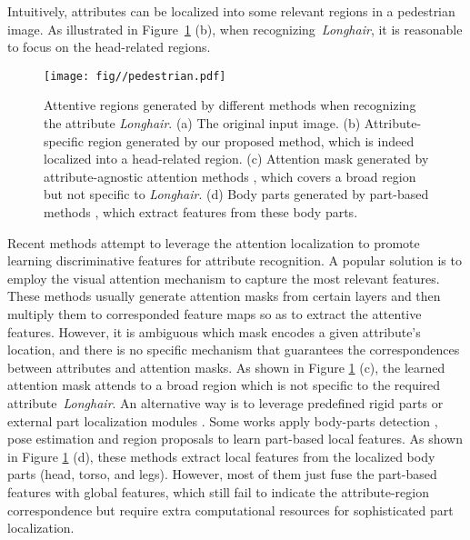 \documentclass[10pt,twocolumn,letterpaper]{article}
\begin{document}
Intuitively, attributes can be localized into some relevant regions in a pedestrian image.
As illustrated in Figure~\ref{fig:pedestrian} (b), when recognizing~\emph{Longhair}, it is reasonable to focus on the head-related regions.
\begin{figure}[t]
\begin{center}
  \texttt{[image: fig//pedestrian.pdf]}
\end{center}
\vspace{-4mm}
   \caption{Attentive regions generated by different methods when recognizing the attribute \textit{Longhair}.
   (a) The original input image.
   (b) Attribute-specific region generated by our proposed method, which is indeed localized into a head-related region.
   (c) Attention mask generated by attribute-agnostic attention methods \cite{hpnet,deepimb,zhuspatialreg}, which covers a broad region but not specific to \textit{Longhair}.
   (d) Body parts generated by part-based methods \cite{li2018pose,liu2018localization,yang2016attribute,zhang2014panda}, which extract features from these body parts.}
\label{fig:pedestrian}
\vspace{-2mm}
\end{figure}
Recent methods attempt to leverage the attention localization to promote learning discriminative features for attribute recognition.
A popular solution \cite{hpnet,deepimb,zhuspatialreg} is to employ the visual attention mechanism to capture the most relevant features.
These methods usually generate attention masks from certain layers and then multiply them to corresponded feature maps so as to extract the attentive features.
However, it is ambiguous which mask encodes a given attribute's location, and there is no specific mechanism that guarantees the correspondences between attributes and attention masks.
As shown in Figure \ref{fig:pedestrian} (c), the learned attention mask attends to a broad region which is not specific to the required attribute~\emph{Longhair}.
An alternative way is to leverage predefined rigid parts \cite{zhu2015multi} or external part localization modules \cite{li2018pose,liu2018localization,yang2016attribute,zhang2014panda}.
Some works apply body-parts detection \cite{zhang2014panda}, pose estimation \cite{li2018pose,yang2016attribute} and region proposals \cite{liu2018localization} to learn part-based local features. As shown in Figure \ref{fig:pedestrian} (d), these methods extract local features from the localized body parts (\eg head, torso, and legs).
However, most of them just fuse the part-based features with global features, which still fail to indicate the attribute-region correspondence but require extra computational resources for sophisticated part localization.
\end{document}
